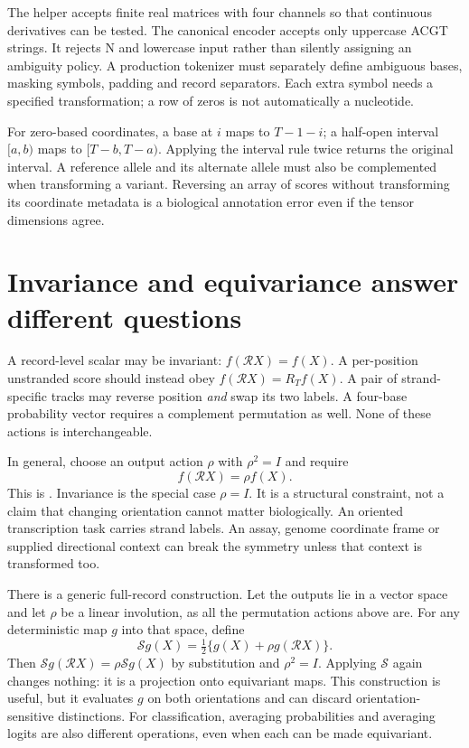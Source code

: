 
The helper accepts finite real matrices with four channels so that continuous
derivatives can be tested. The canonical encoder accepts only uppercase
ACGT strings. It rejects N and lowercase input rather than silently assigning
an ambiguity policy. A production tokenizer must separately define ambiguous
bases, masking symbols, padding and record separators. Each extra symbol needs
a specified transformation; a row of zeros is not automatically a nucleotide.

For zero-based coordinates, a base at $i$ maps to $T-1-i$; a half-open interval
$[a,b)$ maps to $[T-b,T-a)$. Applying the interval rule twice returns the
original interval. A reference allele and its alternate allele must also be
complemented when transforming a variant. Reversing an array of scores without
transforming its coordinate metadata is a biological annotation error even if
the tensor dimensions agree.

\section{Invariance and equivariance answer different questions}

A record-level scalar may be invariant:
$f(\mathcal RX)=f(X)$. A per-position unstranded score should instead obey
$f(\mathcal RX)=R_Tf(X)$. A pair of strand-specific tracks may reverse position
\emph{and} swap its two labels. A four-base probability vector requires a
complement permutation as well. None of these actions is interchangeable.

In general, choose an output action $\rho$ with $\rho^2=I$ and require
\begin{equation}
 f(\mathcal RX)=\rho f(X).
 \label{eq:equiv}
\end{equation}
This is . Invariance is the special case $\rho=I$.
It is a structural constraint, not a claim that changing orientation cannot
matter biologically. An oriented transcription task carries strand labels.
An assay, genome coordinate frame or supplied directional context can break
the symmetry unless that context is transformed too.

There is a generic full-record construction. Let the outputs lie in a vector
space and let $\rho$ be a linear involution, as all the permutation actions
above are. For any deterministic map $g$ into that space, define
\begin{equation}
 \mathcal Sg(X)=\tfrac12\{g(X)+\rho g(\mathcal RX)\}.
 \label{eq:symmetrize}
\end{equation}
Then $\mathcal Sg(\mathcal RX)=\rho\mathcal Sg(X)$ by substitution and
$\rho^2=I$. Applying $\mathcal S$ again changes nothing: it is a projection
onto equivariant maps. This construction is useful, but it evaluates $g$ on
both orientations and can discard orientation-sensitive distinctions.
For classification, averaging probabilities and averaging logits are also
different operations, even when each can be made equivariant.


